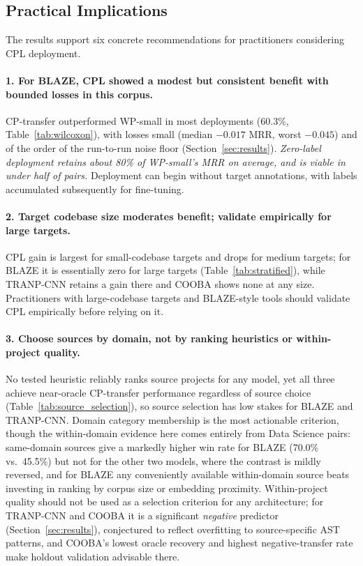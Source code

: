 \documentclass[a4paper,fleqn]{cas-dc}
\begin{document}
\subsection{Practical Implications}

The results support six concrete recommendations for practitioners considering
CPL deployment.

\paragraph{1. For BLAZE, CPL showed a modest but consistent benefit with bounded losses in this corpus.}
CP-transfer outperformed WP-small in most deployments (60.3\%,
Table~\ref{tab:wilcoxon}), with losses small (median $-0.017$ MRR, worst
$-0.045$) and of the order of the run-to-run noise
floor (Section~\ref{sec:results}). \emph{Zero-label deployment retains about
80\% of WP-small's MRR on average, and is viable in under half of pairs.}
Deployment can begin without target annotations, with labels accumulated
subsequently for fine-tuning.

\paragraph{2. Target codebase size moderates benefit; validate empirically for large targets.}
CPL gain is largest for small-codebase targets and drops for medium targets;
for BLAZE it is essentially zero for large targets
(Table~\ref{tab:stratified}), while TRANP-CNN retains a gain there and COOBA
shows none at any size. Practitioners with large-codebase targets and
BLAZE-style tools should validate CPL empirically before relying on it.

\paragraph{3. Choose sources by domain, not by ranking heuristics or within-project quality.}
No tested heuristic reliably ranks source projects for any model, yet all
three achieve near-oracle CP-transfer performance regardless of source choice
(Table~\ref{tab:source_selection}), so source selection has low stakes for
BLAZE and TRANP-CNN. Domain category membership is the most actionable
criterion, though the within-domain evidence here comes entirely from Data
Science pairs: same-domain sources give a markedly higher win rate for
BLAZE (70.0\% vs.\ 45.5\%) but not for the other two models, where the
contrast is mildly reversed, and for BLAZE any conveniently available within-domain source beats
investing in ranking by corpus size or embedding proximity. Within-project
quality should not be used as a selection criterion for any architecture;
for TRANP-CNN and COOBA it is a significant \emph{negative} predictor (Section~\ref{sec:results}),
conjectured to reflect overfitting to source-specific AST patterns, and
COOBA's lowest oracle recovery and highest negative-transfer rate make
holdout validation advisable there.
\end{document}
